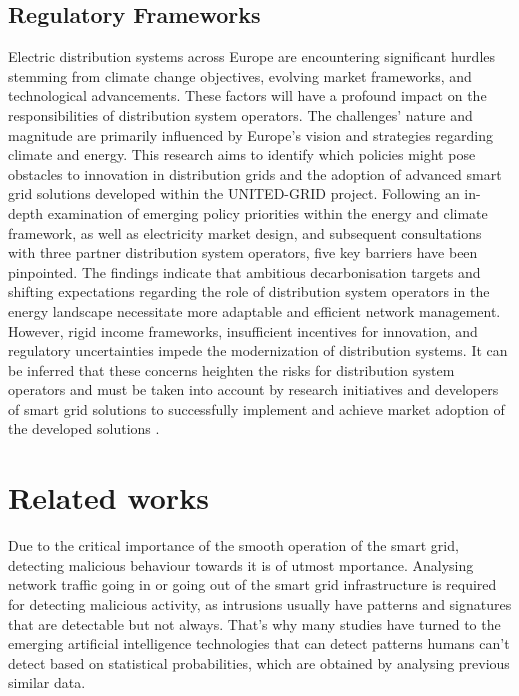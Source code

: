 \subsection{Regulatory Frameworks}
Electric distribution systems across Europe are encountering significant hurdles stemming from climate change objectives, evolving market frameworks, and technological advancements. These factors will have a profound impact on the responsibilities of distribution system operators. The challenges' nature and magnitude are primarily influenced by Europe's vision and strategies regarding climate and energy. This research aims to identify which policies might pose obstacles to innovation in distribution grids and the adoption of advanced smart grid solutions developed within the UNITED-GRID project. Following an in-depth examination of emerging policy priorities within the energy and climate framework, as well as electricity market design, and subsequent consultations with three partner distribution system operators, five key barriers have been pinpointed. The findings indicate that ambitious decarbonisation targets and shifting expectations regarding the role of distribution system operators in the energy landscape necessitate more adaptable and efficient network management. However, rigid income frameworks, insufficient incentives for innovation, and regulatory uncertainties impede the modernization of distribution systems. It can be inferred that these concerns heighten the risks for distribution system operators and must be taken into account by research initiatives and developers of smart grid solutions to successfully implement and achieve market adoption of the developed solutions \cite{rossi2020study}. 



\section{Related works}
Due to the critical importance of the smooth operation of the smart grid, detecting malicious behaviour towards it is of utmost mportance. Analysing network traffic going in or going out of the smart grid infrastructure is required for detecting malicious activity, as intrusions usually have patterns and signatures that are detectable but not always. That's why many studies have turned to the emerging artificial intelligence technologies that can detect patterns humans can't detect based on statistical probabilities, which are obtained by analysing previous similar data.

